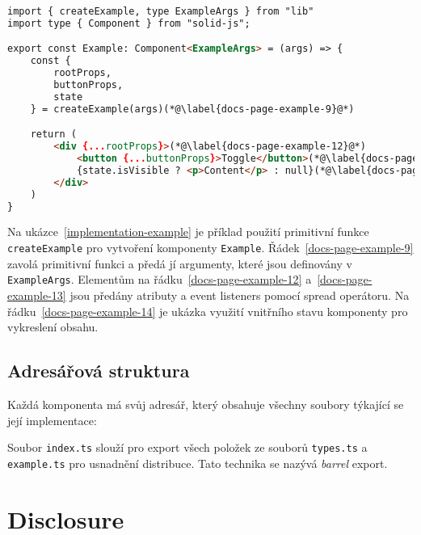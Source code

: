 \begin{lstlisting}[caption={Příklad implementace komponenty pomocí primitivní funkce}, label={implementation-example}, language=html]
import { createExample, type ExampleArgs } from "lib"
import type { Component } from "solid-js";

export const Example: Component<ExampleArgs> = (args) => {
    const {
        rootProps,
        buttonProps,
        state
    } = createExample(args)(*@\label{docs-page-example-9}@*)

    return (
        <div {...rootProps}>(*@\label{docs-page-example-12}@*)
            <button {...buttonProps}>Toggle</button>(*@\label{docs-page-example-13}@*)
            {state.isVisible ? <p>Content</p> : null}(*@\label{docs-page-example-14}@*)
        </div>
    )
}
\end{lstlisting}

Na ukázce~\ref{implementation-example} je příklad použití primitivní funkce \texttt{createExample} pro vytvoření komponenty \texttt{Example}.
Řádek~\ref{docs-page-example-9} zavolá primitivní funkci a předá jí argumenty, které jsou definovány v \texttt{ExampleArgs}.
Elementům na řádku~\ref{docs-page-example-12} a~\ref{docs-page-example-13} jsou předány atributy a event listeners pomocí spread operátoru.
Na řádku~\ref{docs-page-example-14} je ukázka využití vnitřního stavu komponenty pro vykreslení obsahu.

\subsection{Adresářová struktura}

Každá komponenta má svůj adresář, který obsahuje všechny soubory týkající se její implementace:

\vspace{11pt}


\vspace{11pt}

Soubor \texttt{index.ts} slouží pro export všech položek ze souborů \texttt{types.ts} a \texttt{example.ts} pro usnadnění distribuce.
Tato technika se nazývá \textit{barrel} export.

\clearpage

\section{Disclosure}

